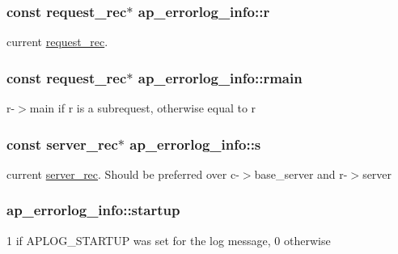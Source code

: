 \subsubsection[{\texorpdfstring{r}{r}}]{\setlength{\rightskip}{0pt plus 5cm}const {\bf request\+\_\+rec}$\ast$ ap\+\_\+errorlog\+\_\+info\+::r}\hypertarget{structap__errorlog__info_abd103ecdefbb9b125652c29c813e2cfd}{}\label{structap__errorlog__info_abd103ecdefbb9b125652c29c813e2cfd}
current \hyperlink{structrequest__rec}{request\+\_\+rec}. 
\subsubsection[{\texorpdfstring{rmain}{rmain}}]{\setlength{\rightskip}{0pt plus 5cm}const {\bf request\+\_\+rec}$\ast$ ap\+\_\+errorlog\+\_\+info\+::rmain}\hypertarget{structap__errorlog__info_a62d087e91f9972844853e6756dc1eb7d}{}\label{structap__errorlog__info_a62d087e91f9972844853e6756dc1eb7d}
r-\/$>$main if r is a subrequest, otherwise equal to r 
\subsubsection[{\texorpdfstring{s}{s}}]{\setlength{\rightskip}{0pt plus 5cm}const {\bf server\+\_\+rec}$\ast$ ap\+\_\+errorlog\+\_\+info\+::s}\hypertarget{structap__errorlog__info_ae448c3f279eb954f858e0f2a52a97f58}{}\label{structap__errorlog__info_ae448c3f279eb954f858e0f2a52a97f58}
current \hyperlink{structserver__rec}{server\+\_\+rec}. Should be preferred over c-\/$>$base\+\_\+server and r-\/$>$server 
\subsubsection[{\texorpdfstring{startup}{startup}}]{ ap\+\_\+errorlog\+\_\+info\+::startup}\hypertarget{structap__errorlog__info_a4a74c5bb31860ed423115fa0ac2cb202}{}\label{structap__errorlog__info_a4a74c5bb31860ed423115fa0ac2cb202}
1 if A\+P\+L\+O\+G\+\_\+\+S\+T\+A\+R\+T\+UP was set for the log message, 0 otherwise 
